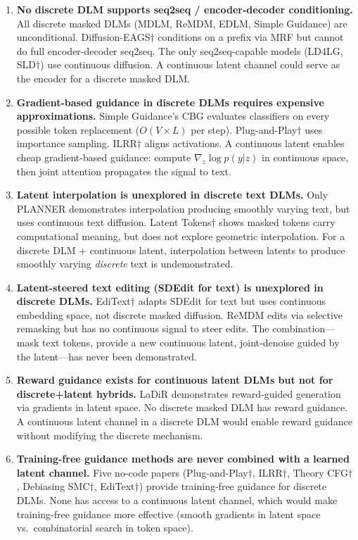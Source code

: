 \documentclass{article}
\begin{document}
\begin{enumerate}[label=\textbf{C\arabic*.}, leftmargin=2em]
    \item \textbf{No discrete DLM supports seq2seq / encoder-decoder conditioning.}
    All discrete masked DLMs (MDLM, ReMDM, EDLM, Simple Guidance) are unconditional. Diffusion-EAGS$\dagger$ conditions on a prefix via MRF but cannot do full encoder-decoder seq2seq. The only seq2seq-capable models (LD4LG, SLD$\dagger$) use continuous diffusion. A continuous latent channel could serve as the encoder for a discrete masked DLM.

    \item \textbf{Gradient-based guidance in discrete DLMs requires expensive approximations.}
    Simple Guidance's CBG evaluates classifiers on every possible token replacement ($O(V \times L)$ per step). Plug-and-Play$\dagger$ uses importance sampling. ILRR$\dagger$ aligns activations. A continuous latent enables cheap gradient-based guidance: compute $\nabla_z \log p(y|z)$ in continuous space, then joint attention propagates the signal to text.

    \item \textbf{Latent interpolation is unexplored in discrete text DLMs.}
    Only PLANNER demonstrates interpolation producing smoothly varying text, but uses continuous text diffusion. Latent Tokens$\dagger$ shows masked tokens carry computational meaning, but does not explore geometric interpolation. For a discrete DLM + continuous latent, interpolation between latents to produce smoothly varying \emph{discrete} text is undemonstrated.

    \item \textbf{Latent-steered text editing (SDEdit for text) is unexplored in discrete DLMs.}
    EdiText$\dagger$ adapts SDEdit for text but uses continuous embedding space, not discrete masked diffusion. ReMDM edits via selective remasking but has no continuous signal to steer edits. The combination---mask text tokens, provide a new continuous latent, joint-denoise guided by the latent---has never been demonstrated.

    \item \textbf{Reward guidance exists for continuous latent DLMs but not for discrete+latent hybrids.}
    LaDiR demonstrates reward-guided generation via gradients in latent space. No discrete masked DLM has reward guidance. A continuous latent channel in a discrete DLM would enable reward guidance without modifying the discrete mechanism.

    \item \textbf{Training-free guidance methods are never combined with a learned latent channel.}
    Five no-code papers (Plug-and-Play$\dagger$, ILRR$\dagger$, Theory CFG$\dagger$, Debiasing SMC$\dagger$, EdiText$\dagger$) provide training-free guidance for discrete DLMs. None has access to a continuous latent channel, which would make training-free guidance more effective (smooth gradients in latent space vs.\ combinatorial search in token space).
\end{enumerate}
\end{document}
